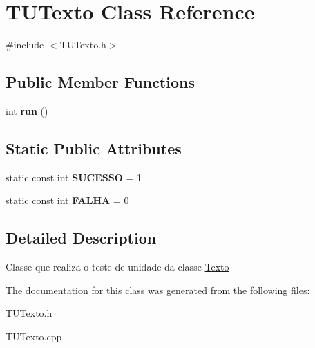 \hypertarget{classTUTexto}{}\section{T\+U\+Texto Class Reference}
\label{classTUTexto}


{\ttfamily \#include $<$T\+U\+Texto.\+h$>$}

\subsection*{Public Member Functions}
\begin{DoxyCompactItemize}
\item 
int {\bfseries run} ()\hypertarget{classTUTexto_afd0ced06861f0e336ef7248f36b31e2c}{}\label{classTUTexto_afd0ced06861f0e336ef7248f36b31e2c}

\end{DoxyCompactItemize}
\subsection*{Static Public Attributes}
\begin{DoxyCompactItemize}
\item 
static const int {\bfseries S\+U\+C\+E\+S\+SO} = 1\hypertarget{classTUTexto_a85843f1840647cc1c8dc2606fe03dc36}{}\label{classTUTexto_a85843f1840647cc1c8dc2606fe03dc36}

\item 
static const int {\bfseries F\+A\+L\+HA} = 0\hypertarget{classTUTexto_ad225db82ebc02a313957712dbc70abd2}{}\label{classTUTexto_ad225db82ebc02a313957712dbc70abd2}

\end{DoxyCompactItemize}


\subsection{Detailed Description}
Classe que realiza o teste de unidade da classe \hyperlink{classTexto}{Texto} 

The documentation for this class was generated from the following files\+:\begin{DoxyCompactItemize}
\item 
T\+U\+Texto.\+h\item 
T\+U\+Texto.\+cpp\end{DoxyCompactItemize}
